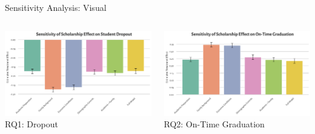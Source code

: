 \documentclass[aspectratio=169]{beamer}
\begin{document}
\begin{frame}{Sensitivity Analysis: Visual}
\\
\vspace{30pt}

\begin{columns}

\begin{column}{0.5\textwidth}
\centering
\includegraphics[width=1\linewidth]{Tex_Pictures/sensitivityrq1.png} \\
\small RQ1: Dropout
\end{column}
\begin{column}{0.5\textwidth}
\centering
\includegraphics[width=1\linewidth]{Tex_Pictures/sensitivityrq2.png} \\
\small RQ2: On-Time Graduation
\end{column}
\end{columns}
\end{frame}
\end{document}
